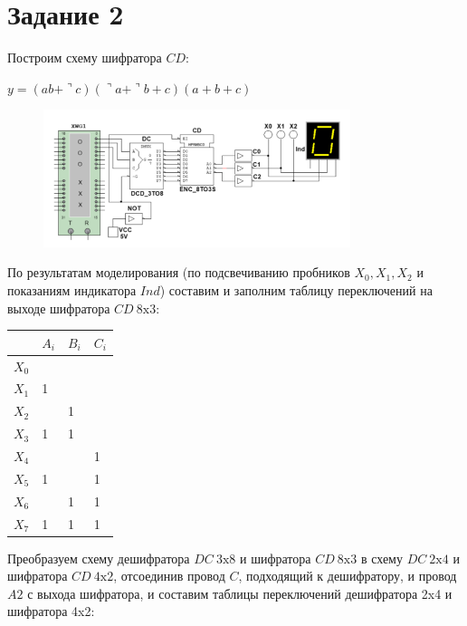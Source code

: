 \documentclass[bachelor, och, labwork]{shiza}
\begin{document}
\section{Задание 2}
Построим схему шифратора $CD$:


\begin{center}$y=(ab+\urcorner c)(\urcorner a+\urcorner b+c)(a+b+c)$\end{center}

\begin{figure}[H]
    \centering
    \includegraphics[width=0.8\textwidth]{pic2/2.png}
    \caption{}
\end{figure}

По результатам моделирования (по подсвечиванию пробников $X_0,X_1,X_2$ и 
показаниям индикатора $Ind$) составим и заполним таблицу переключений на выходе
шифратора $CD ~8\text{x}3$:

\begin{table}[h]
    \begin{center}
    \begin{tabular}{|l|l|l|l|}
    \hline
          & $A_i$ & $B_i$ & $C_i$ \\ \hline
    $X_0$ &       &       &       \\ \hline
    $X_1$ & 1     &       &       \\ \hline
    $X_2$ &       & 1     &       \\ \hline
    $X_3$ & 1     & 1     &       \\ \hline
    $X_4$ &       &       & 1     \\ \hline
    $X_5$ & 1     &       & 1     \\ \hline
    $X_6$ &       & 1     & 1     \\ \hline
    $X_7$ & 1     & 1     & 1     \\ \hline
    \end{tabular}
    \end{center}
\end{table}

Преобразуем схему дешифратора $DC~3 \text{x}8$ и шифратора $CD~8\text{x}3$ в схему
$DC ~2\text{x}4$ и шифратора $CD~4\text{x}2$, отсоединив провод $C$, подходящий
к дешифратору, и провод $A2$ с выхода шифратора, и составим таблицы переключений
дешифратора 2x4 и шифратора 4x2:
\end{document}
